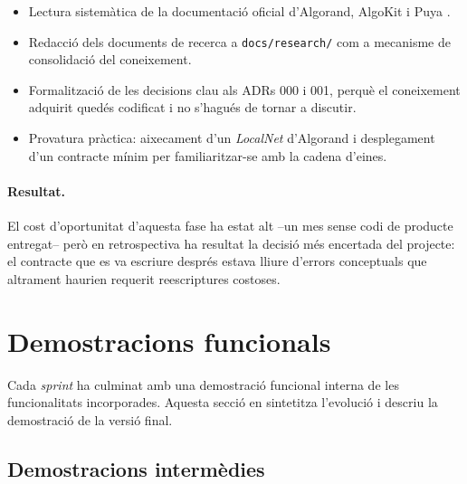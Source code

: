 \begin{itemize}
    \item Lectura sistemàtica de la documentació oficial d'Algorand,
    AlgoKit \cite{algorandfoundation2024algokit} i Puya
    \cite{algorandfoundation2024puya}.
    \item Redacció dels documents de recerca a \texttt{docs/research/}
    com a mecanisme de consolidació del coneixement.
    \item Formalització de les decisions clau als \acp{ADR} 000 i
    001, perquè el coneixement adquirit quedés codificat i no s'hagués
    de tornar a discutir.
    \item Provatura pràctica: aixecament d'un \emph{LocalNet}
    d'Algorand i desplegament d'un contracte mínim per familiaritzar-se
    amb la cadena d'eines.
\end{itemize}

\paragraph{Resultat.} El cost d'oportunitat d'aquesta fase ha estat
alt --un mes sense codi de producte entregat-- però en retrospectiva
ha resultat la decisió més encertada del projecte: el contracte que
es va escriure després estava lliure d'errors conceptuals que
altrament haurien requerit reescriptures costoses.

\section{Demostracions funcionals}
\label{sec:demos}

Cada \emph{sprint} ha culminat amb una demostració funcional interna
de les funcionalitats incorporades. Aquesta secció en sintetitza
l'evolució i descriu la demostració de la versió final.

\subsection{Demostracions intermèdies}

